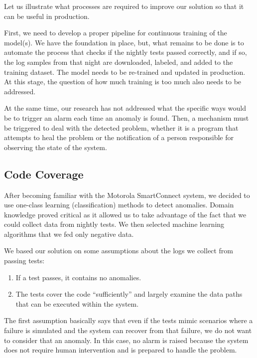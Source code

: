 Let us illustrate what processes are required to improve our solution so that it can be useful in production.

First, we need to develop a proper pipeline for continuous training of the model(s). We have the foundation in place, but, what remains to be done is to automate the process that checks if the nightly tests passed correctly, and if so, the log samples from that night are downloaded, labeled, and added to the training dataset. The model needs to be re-trained and updated in production. At this stage, the question of how much training is too much also needs to be addressed.

At the same time, our research has not addressed what the specific ways would be to trigger an alarm  each time an anomaly is found. Then, a mechanism must be triggered to deal with the detected problem, whether it is a program that attempts to heal the problem or the notification of a person responsible for observing the state of the system.

\subsection{Code Coverage}
\label{code_coverage}
After becoming familiar with the Motorola SmartConnect system, we decided to use one-class learning (classification) methods to detect anomalies.
Domain knowledge proved critical as it allowed us to take advantage of the fact that we could collect data from nightly tests. 
We then selected machine learning algorithms that we fed only negative data.

We based our solution on some assumptions about the logs we collect from passing tests:
\begin{enumerate}

    \item If a test passes, it contains no anomalies.
    \item The tests cover the code “sufficiently” and largely examine the data paths that can be executed within the system. 

\end{enumerate}

The first assumption basically says that even if the tests mimic scenarios where a failure is simulated and the system can recover from that failure, we do not want to consider that an anomaly. 
In this case, no alarm is raised because the system does not require human intervention and is prepared to handle the problem.

